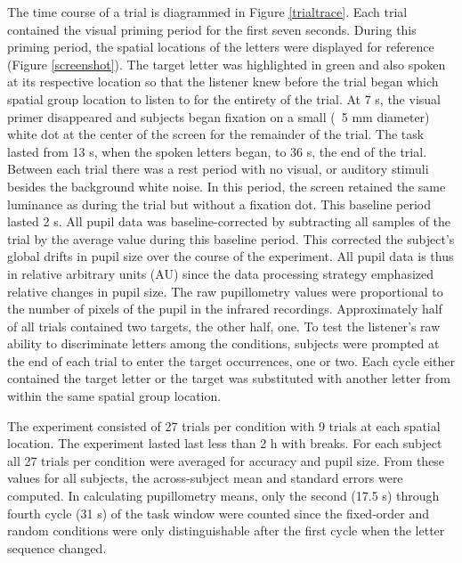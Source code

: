 \documentclass[10pt]{article}
\begin{document}
The time course of a trial is diagrammed in Figure \ref{trialtrace}.
Each trial contained the visual priming period for the first seven seconds.
During this priming period, the spatial locations of the letters
were displayed for reference (Figure \ref{screenshot}).  The target letter was highlighted in
green and also spoken at its respective location so that the
listener knew before the trial began which spatial group location to
listen to for the entirety of the trial. At 7 s, the visual
primer disappeared and subjects began fixation on a small (~5 mm
diameter) white dot at the center of the screen for the remainder of
the trial.  The task lasted from 13 s, when the spoken letters
began, to 36 s, the end of the trial.  Between each trial there was a rest
period with no visual, or auditory stimuli besides the background
white noise.  In this period, the screen retained the same luminance
as during the trial but without a fixation dot. This baseline period
lasted 2 s.  All pupil data was baseline-corrected by
subtracting all samples of the trial by the average value during
this baseline period.  This corrected the subject's global drifts in pupil
size over the course of the experiment.  All pupil data is thus in relative arbitrary units
(AU) since the data processing strategy emphasized relative
changes in pupil size.  The raw pupillometry values were proportional
to the number of pixels of the pupil in the infrared recordings.
Approximately half of all trials contained two targets, the other
half, one. To test the listener's raw ability to discriminate letters
among the conditions, subjects were prompted at the end of each
trial to enter the target occurrences, one or two. Each cycle either
contained the target letter or the target was substituted with
another letter from within the same spatial group location.

The experiment consisted of 27 trials per condition
with 9 trials at each spatial location.  The experiment
lasted last less than 2 h with breaks.   For each
subject all 27 trials per condition were averaged for accuracy
and pupil size.  From these values for all subjects, the across-subject mean and
standard errors were computed.  In calculating pupillometry
means, only the second (17.5 s) through fourth cycle (31 s) of
the task window were counted since the fixed-order and random
conditions were only distinguishable after the first cycle
when the letter sequence changed.
\end{document}
